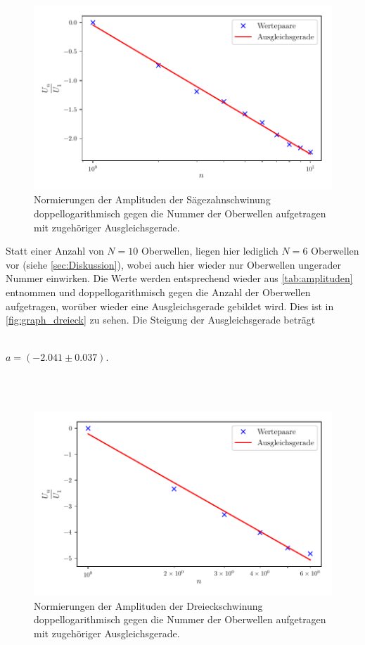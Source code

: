 \begin{figure}
  \centering
  \includegraphics{build/saegezahn.pdf}
  \caption{Normierungen der Amplituden der Sägezahnschwinung doppellogarithmisch gegen die Nummer der Oberwellen aufgetragen mit zugehöriger Ausgleichsgerade.}
  \label{fig:graph_saegezahn}
\end{figure}
Statt einer Anzahl von $N = 10$ Oberwellen, liegen hier lediglich $N = 6$ Oberwellen vor (siehe \autoref{sec:Diskussion}),
wobei auch hier wieder nur Oberwellen ungerader Nummer einwirken.
Die Werte werden entsprechend wieder aus \autoref{tab:amplituden} entnommen und doppellogarithmisch gegen die Anzahl der 
Oberwellen aufgetragen, worüber wieder eine Ausgleichsgerade gebildet wird. Dies ist in \autoref{fig:graph_dreieck} zu sehen.
Die Steigung der Ausgleichsgerade beträgt 
\\ \\
\centerline{$a = ( -2.041 \pm 0.037 )$.}
\\ \\
\begin{figure}
  \centering
  \includegraphics{build/dreieck.pdf}
  \caption{Normierungen der Amplituden der Dreieckschwinung doppellogarithmisch gegen die Nummer der Oberwellen aufgetragen mit zugehöriger Ausgleichsgerade.}
  \label{fig:graph_dreieck}
\end{figure}
\newpage
